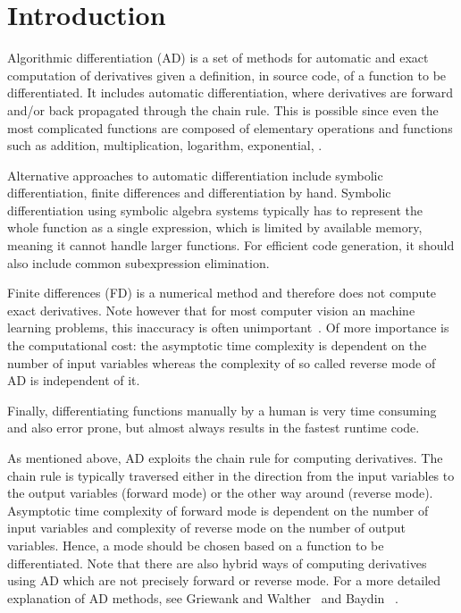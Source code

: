 \documentclass[suppldata]{article}
\begin{document}
\section{Introduction}
\label{sec:intro}
Algorithmic differentiation (AD) is a set of methods for automatic and exact computation of derivatives given a definition, in source code, of a function to be differentiated.  It includes automatic differentiation, where derivatives are forward and/or back propagated through the chain rule. This is possible since even the most complicated functions are composed of elementary operations and functions such as addition, multiplication, logarithm, exponential, \etc.

Alternative approaches to automatic differentiation include symbolic differentiation, finite differences and differentiation by hand.  Symbolic differentiation using symbolic algebra systems typically has to represent the whole function as a single expression, which is limited by available memory, meaning it cannot handle larger functions. For efficient code generation, it should also include common subexpression elimination.  

Finite differences (FD) is a numerical method and therefore does not compute exact derivatives.  Note however that for most computer vision an machine learning problems, this inaccuracy is often unimportant~\cite{Triggs99ba}.
Of more importance is the computational cost: the asymptotic time complexity is dependent on the number of input variables whereas the complexity of so called reverse mode of AD is independent of it.

Finally, differentiating functions manually by a human is very time consuming and also error prone, but almost always results in the fastest runtime code.

As mentioned above, AD exploits the chain rule for computing derivatives. The chain rule is typically traversed either in the direction from the input variables to the output variables (forward mode) or the other way around (reverse mode).
Asymptotic time complexity of forward mode is dependent on the number of input variables and complexity of reverse mode on the number of output variables. Hence, a mode should be chosen based on a function to be differentiated. Note that there are also hybrid ways of computing derivatives using AD which are not precisely forward or reverse mode. For a more detailed explanation of AD methods, see Griewank and Walther~\cite{Griewank08} and Baydin \etal~\cite{Baydin15survey}.
\end{document}
